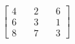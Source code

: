 \documentclass[preview]{standalone}
\begin{document}
\begin{align*}
\begin{bmatrix} 4 & \quad 2 & \quad 6 \\ 6 & \quad 3 & \quad 1 \\ 8 & \quad 7 & \quad 3 \end{bmatrix}
\end{align*}
\end{document}
